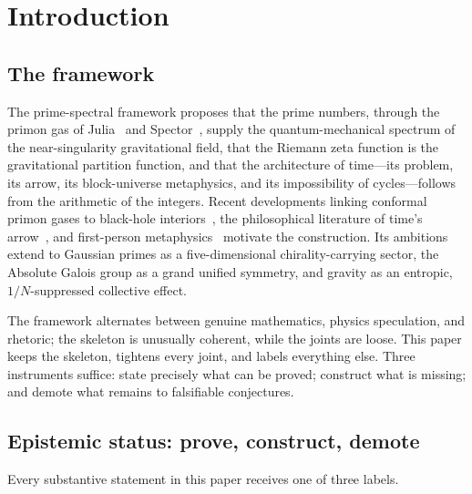\bigskip

\section{Introduction}\label{sec:intro}

\subsection{The framework}

The prime-spectral framework proposes that the prime numbers, through the primon gas of
Julia~\cite{julia1990} and Spector~\cite{spector1998}, supply the quantum-mechanical spectrum
of the near-singularity gravitational field, that the Riemann zeta function is the gravitational
partition function, and that the architecture of time---its problem, its arrow, its
block-universe metaphysics, and its impossibility of cycles---follows from the arithmetic of the
integers. Recent developments linking conformal primon gases to black-hole
interiors~\cite{hartnollyang2026}, the philosophical literature of time's
arrow~\cite{carroll2010,wallace2017,price1996}, and first-person
metaphysics~\cite{hellie2013,hare2009,conitzer2019} motivate the construction. Its ambitions
extend to Gaussian primes as a five-dimensional chirality-carrying sector, the Absolute Galois
group as a grand unified symmetry, and gravity as an entropic, $1/N$-suppressed collective
effect.

The framework alternates between genuine mathematics, physics speculation, and rhetoric; the
skeleton is unusually coherent, while the joints are loose. This paper keeps the skeleton,
tightens every joint, and labels everything else. Three instruments suffice: state precisely
what can be proved; construct what is missing; and demote what remains to falsifiable
conjectures.

\subsection{Epistemic status: prove, construct, demote}\label{sec:method}

Every substantive statement in this paper receives one of three labels.

